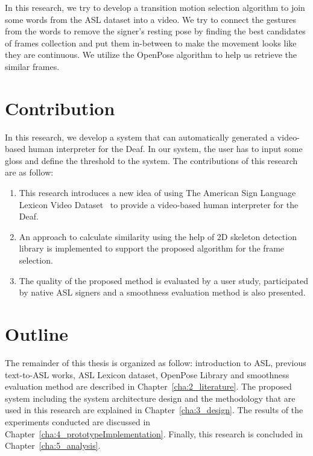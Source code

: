 In this research, we try to develop a transition motion selection algorithm to join some words from the ASL dataset into a video. We try to connect the gestures from the words to remove the signer's resting pose by finding the best candidates of frames collection and put them in-between to make the movement looks like they are continuous. We utilize the OpenPose algorithm to help us retrieve the similar frames.

\section{Contribution}
\label{sec:2_contribution}
In this research, we develop a system that can automatically generated a video-based human interpreter for the Deaf. In our system, the user has to input some gloss and define the threshold to the system. The contributions of this research are as follow:\begin{enumerate}
	\item This research introduces a new idea of using The American Sign Language Lexicon Video Dataset~\cite{ASLLexiconVideoDataset} to provide a video-based human interpreter for the Deaf.
	\item An approach to calculate similarity using the help of 2D skeleton detection library is implemented to support the proposed algorithm for the frame selection.
	\item The quality of the proposed method is evaluated by a user study, participated by native ASL signers and a smoothness evaluation method is also presented.
\end{enumerate}

\section{Outline}
\label{sec:3_outline}
The remainder of this thesis is organized as follow: introduction to ASL, previous text-to-ASL works, ASL Lexicon dataset, OpenPose Library and smoothness evaluation method are described in Chapter~\ref{cha:2_literature}. The proposed system including the system architecture design and the methodology that are used in this research are explained in Chapter~\ref{cha:3_design}. The results of the experiments conducted are discussed in Chapter~\ref{cha:4_prototypeImplementation}.  Finally, this research is concluded in Chapter~\ref{cha:5_analysis}.
